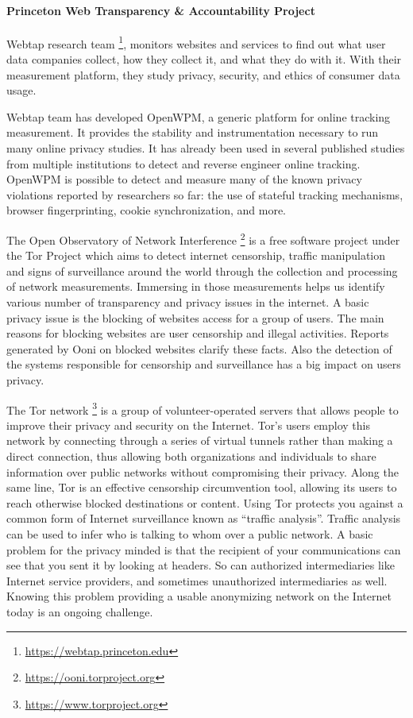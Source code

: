 \paragraph{Princeton Web Transparency \& Accountability Project\\}

Webtap research team \footnote{\url{https://webtap.princeton.edu}}, monitors 
websites and services to find out what user data 
companies collect, how they collect it, and what they do with it. With their 
measurement platform, they study privacy, security, and ethics of consumer data 
usage.

Webtap team has developed  OpenWPM, a generic platform for online tracking 
measurement. It provides the stability and instrumentation necessary to run many 
online privacy studies. It has already been used in several published studies 
from multiple institutions to detect and reverse engineer online tracking.
OpenWPM  is possible to detect and measure many of the known privacy violations 
reported by researchers so far: the use of stateful tracking mechanisms, browser 
fingerprinting, cookie synchronization, and more.

The Open Observatory of Network Interference 
\footnote{\url{https://ooni.torproject.org}} is a free software project under 
the Tor Project which aims to detect internet censorship, traffic manipulation 
and signs of surveillance around the world through the collection and processing 
of network measurements. Immersing in those measurements helps us identify 
various number of transparency and privacy issues in the internet.  
A basic privacy issue is the blocking of websites  access for a group of users. 
The main reasons for blocking websites are user censorship and illegal 
activities. Reports generated by Ooni  on blocked websites clarify these facts. 
Also the detection of the systems responsible for censorship and surveillance 
has a big impact on users privacy.

The Tor network \footnote{\url{https://www.torproject.org}} is a group of 
volunteer-operated servers that allows people to 
improve their privacy and security on the Internet. Tor's users employ this 
network by connecting through a series of virtual tunnels rather than making a 
direct connection, thus allowing both organizations and individuals to share 
information over public networks without compromising their privacy. Along the 
same line, Tor is an effective censorship circumvention tool, allowing its users 
to reach otherwise blocked destinations or content.
Using Tor protects you against a common form of Internet surveillance known as 
``traffic analysis''. Traffic analysis can be used to infer who is talking to 
whom over a public network.
A basic problem for the privacy minded is that the recipient of your 
communications can see that you sent it by looking at headers. So can authorized 
intermediaries like Internet service providers, and sometimes unauthorized 
intermediaries as well.
Knowing this problem providing a usable anonymizing network on the Internet 
today is an ongoing challenge. 

